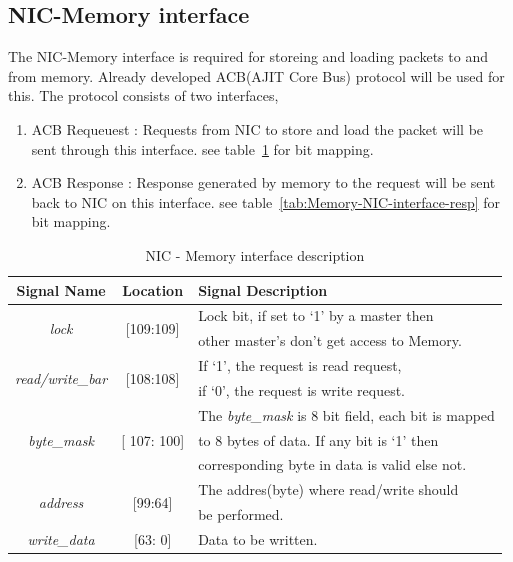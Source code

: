 \documentclass[12pt]{report}
\begin{document}
		\subsection{NIC-Memory interface}
			The NIC-Memory interface is required for storeing and loading packets to and from memory. Already developed ACB(AJIT Core Bus) protocol will be used for this.
                        The protocol consists of two interfaces,
			\begin{enumerate}
				\item ACB Requeuest : Requests from NIC to store and load the packet will be sent through this interface. see table~\ref{tab:NIC-Memory-interface-req} for bit mapping.
				\item ACB Response : Response generated by memory to the request will be sent back to NIC on this interface. see table~\ref{tab:Memory-NIC-interface-resp} for bit mapping.
			\end{enumerate}

				\begin{table}[!htbp]
					\centering
					\begin{tabular}{ccl}
						\hline
						\textbf{Signal Name} 			& \textbf{Location} 		&\textbf{Signal Description}  \\ \hline
						\multirow{2}{*}{\textit{lock}}		& \multirow{2}{*}{[109:109]}	& Lock bit, if set to `1' by a master then\\
											&				& other master's don't get access to Memory.\\ \hline
						\multirow{2}{*}{\textit{read/write\_bar}}& \multirow{2}{*}{[108:108]}	& If `1', the request is read request,\\ 
											& 				& if `0', the request is write request.\\ \hline
						\multirow{3}{*}{\textit{byte\_mask}}	& \multirow{3}{*}{[ 107: 100]}	& The \textit{byte\_mask} is 8 bit field, each bit is mapped\\
											&				& to 8 bytes of data. If any bit is `1' then\\
											& 				& corresponding byte in data is valid else not.\\ \hline 
						\multirow{2}{*}{\textit{address}}   	& \multirow{2}{*}{[99:64]} 	& The addres(byte) where read/write should\\ 
											&				& be performed.\\ \hline
						\textit{write\_data}   			& [63: 0] 			& Data to be written.\\ \hline
					\end{tabular}
					\caption{NIC - Memory interface description}
					\label{tab:NIC-Memory-interface-req}
				\end{table}
\end{document}

